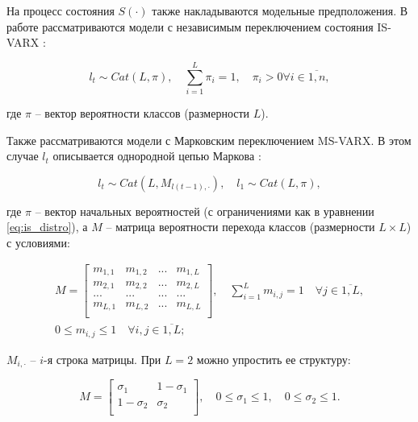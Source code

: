 \documentclass[a4paper,14pt]{extreport}
\begin{document}
На процесс состояния $S(\cdot)$ также накладываются модельные предположения. В работе рассматриваются модели с независимым переключением состояния IS-VARX \cite{mal_multidim_nonhomogenous}:

\begin{equation}
	l_t \sim \mathit{Cat}(L, \pi), \quad \sum_{i=1}^{L}{\pi_i} = 1, \quad \pi_i > 0  \forall i \in \overline{1,n},
	\label{eq:is_distro}
\end{equation}

\noindent
где $\pi$ -- вектор вероятности классов (размерности $L$).

Также рассматриваются модели с Марковским переключением MS-VARX. 
В этом случае $l_t$ описывается однородной цепью Маркова  \cite{malNovopMSVARX}:

\begin{equation}
	l_t \sim \mathit{Cat}(L, M_{l(t-1), \cdot}),
	\quad 
	l_1 \sim \mathit{Cat}(L, \pi) ,
\end{equation}

\noindent
где $\pi$ -- вектор начальных вероятностей (с ограничениями как в уравнении \eqref{eq:is_distro}), а $M$ -- матрица вероятности перехода классов (размерности $L \times L$) с условиями:

\begin{equation}
	\begin{multlined}
		M=
		\left[
			{
					\begin{array}{cccc}
						m_{1,1} & m_{1,2} & ... & m_{1,L} \\
						m_{2,1} & m_{2,2} & ... & m_{2,L} \\
						...     & ...     & ... & ...     \\
						m_{L,1} & m_{L,2} & ... & m_{L,L} \\
					\end{array}
				}
			\right]
		, \quad
		\sum_{i=1}^{L} m_{i,j} = 1 \quad \forall j \in \overline{1,L}
		,
		\\
		0 \le m_{i,j} \le 1 \quad \forall i, j \in \overline{1,L} ;
	\end{multlined}
\end{equation}

\noindent
$M_{i, \cdot}$ -- $i$-я строка матрицы. При $L=2$ можно упростить ее структуру:

\begin{equation}
	M=
	\left[ {
				\begin{array}{cc}
					\sigma_{1}   & 1-\sigma_{1} \\
					1-\sigma_{2} & \sigma_{2}   \\
				\end{array}
			} \right]
	, \quad 
	0 \le \sigma_{1} \le 1
	, \quad 
	0 \le \sigma_{2} \le 1
	.
\end{equation}
\end{document}
